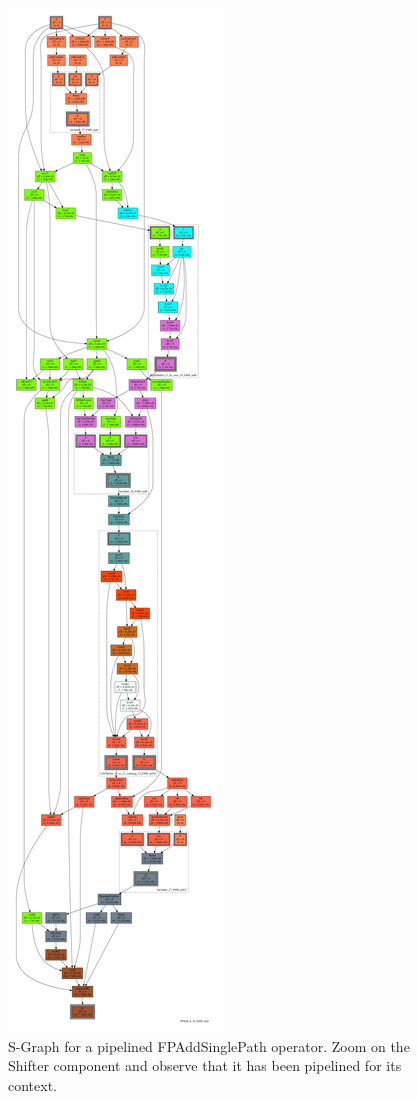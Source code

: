 \documentclass{article}
\begin{document}
  \begin{figure}
    \includegraphics[height=\textheight]{Fig/depgraphFPAddPipelined}
		\centering
		\caption{S-Graph for a pipelined FPAddSinglePath operator. Zoom on the Shifter component and observe that it has been pipelined for its context.}
		\label{fig:depgraphFPAdd}
	\end{figure}    
\end{document}

